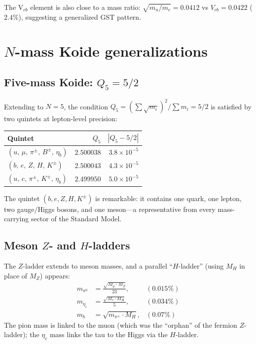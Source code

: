 \documentclass[11pt]{article}
\begin{document}
The V$_{cb}$ element is also close to a mass ratio:
$\sqrt{m_u/m_c} = 0.0412$ vs $V_{cb} = 0.0422$ ($2.4\%$),
suggesting a generalized GST pattern.

\section{$N$-mass Koide generalizations}

\subsection{Five-mass Koide: $Q_5 = 5/2$}

Extending to $N=5$, the condition
$Q_5 = (\sum\sqrt{m_i})^2/\sum m_i = 5/2$
is satisfied by two quintets at lepton-level precision:
\begin{center}\small
\begin{tabular}{@{}l r r@{}}
\toprule
Quintet & $Q_5$ & $|Q_5-5/2|$ \\
\midrule
$(u,\,\mu,\,\pi^\pm,\,B^\pm,\,\eta_b)$ & $2.500038$ & $3.8\times 10^{-5}$ \\
$(b,\,e,\,Z,\,H,\,K^\pm)$ & $2.500043$ & $4.3\times 10^{-5}$ \\
$(u,\,c,\,\pi^\pm,\,K^\pm,\,\eta_b)$ & $2.499950$ & $5.0\times 10^{-5}$ \\
\bottomrule
\end{tabular}
\end{center}

\noindent
The quintet $(b,e,Z,H,K^\pm)$ is remarkable: it contains one
quark, one lepton, two gauge/Higgs bosons, and one meson---a
representative from every mass-carrying sector of the Standard
Model.

\subsection{Meson $Z$- and $H$-ladders}

The $Z$-ladder extends to meson masses, and a parallel
``$H$-ladder'' (using $M_H$ in place of $M_Z$) appears:
\begin{align}
  m_{\pi^0} &= \frac{\sqrt{M_\mu\cdot M_Z}}{23},
  & (0.015\%) \\
  m_{\eta_c} &= \frac{\sqrt{M_\tau\cdot M_H}}{5},
  & (0.034\%) \\
  m_b &= \sqrt{m_{\pi^\pm}\cdot M_H},
  & (0.07\%)
\end{align}
The pion mass is linked to the muon (which was the ``orphan''
of the fermion $Z$-ladder); the $\eta_c$ mass links the tau
to the Higgs via the $H$-ladder.
\end{document}
